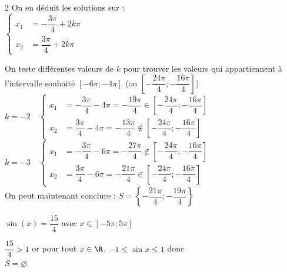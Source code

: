 \documentclass[11pt,a4paper]{article}  %
\begin{document}
\begin{enumMet}
\begin{corrBox}
\begin{multicols}{2}
			\columnbreak
			On en déduit les solutions sur \R:\\
			$\begin{cases}
				x_1 &=-\dfrac{3\pi}{4}+2k\pi\\
				x_2 &=\dfrac{3\pi}{4}+2k\pi\
			\end{cases}$\\
		\end{multicols}
		On teste différentes valeurs de $k$ pour trouver les valeurs qui appartiennent à l'intervalle souhaité $\left[-6\pi;-4\pi\right]$ (ou $\left[-\dfrac{24\pi}{4};-\dfrac{16\pi}{4}\right]$)\\
		$k=-2\quad \begin{cases}
			x_1 &=-\dfrac{3\pi}{4}-4\pi=-\dfrac{19\pi}{4}\in\left[-\dfrac{24\pi}{4};-\dfrac{16\pi}{4}\right]\\
			x_2 &=\dfrac{3\pi}{4}-4\pi=-\dfrac{13\pi}{4}\notin\left[-\dfrac{24\pi}{4};-\dfrac{16\pi}{4}\right]
		\end{cases}$\\
		$k=-3\quad \begin{cases}
			x_1 &=-\dfrac{3\pi}{4}-6\pi=-\dfrac{27\pi}{4}\notin\left[-\dfrac{24\pi}{4};-\dfrac{16\pi}{4}\right]\\
			x_2 &=\dfrac{3\pi}{4}-6\pi=-\dfrac{21\pi}{4}\in\left[-\dfrac{24\pi}{4};-\dfrac{16\pi}{4}\right]
		\end{cases}$\\
		On peut maintenant conclure : $S=\left\{-\dfrac{21\pi}{4};-\dfrac{19\pi}{4}\right\}$
	\end{corrBox}
	\item $\sin(x)=\dfrac{15}{4}$ avec $x\in \left[-5\pi;5\pi\right]$\\
	\begin{corrBox}
		$\dfrac{15}{4}>1$ or pour tout $x \in \R$, $-1\leqslant \sin x\leqslant1$ donc\\
		$S=\varnothing$
	\end{corrBox}
\end{enumMet}
\end{document}
